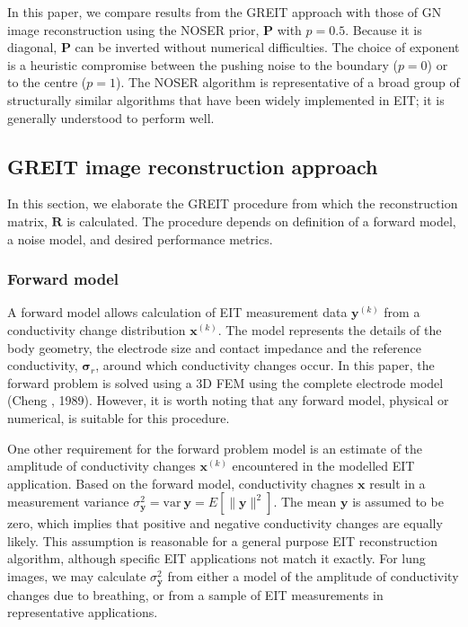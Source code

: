 \documentclass[12pt]{iopart}
\newcommand{\xB}{\mbox{$\mathbf{x}$}}
\newcommand{\yB}{\mbox{$\mathbf{y}$}}
\newcommand{\RB}{\mbox{$\mathbf{R}$}}
\renewcommand{\PB}{\mbox{$\mathbf{P}$}}
\newcommand{\sG}{\mbox{${\boldsymbol \sigma}$}}
\begin{document}
In this paper, we compare results from the GREIT approach
with those of GN image reconstruction using the NOSER prior,
$\PB$ with $p=0.5$.
Because it is diagonal, $\PB$ can be
inverted without numerical difficulties. The choice of exponent is
a heuristic compromise between the pushing noise to the boundary
($p=0$) or to the centre ($p=1$). The NOSER algorithm is 
representative of a broad group of structurally similar 
algorithms that have been widely implemented in EIT;
it is generally understood to perform well.


\subsection{GREIT image reconstruction approach}

In this section, we elaborate the GREIT procedure
from which the reconstruction matrix, $\RB$ is
calculated.  The procedure depends on definition
of a forward model, a noise model, and
desired performance metrics.

\subsubsection{Forward model}

A forward model allows calculation of EIT
 measurement
data $\yB^{(k)}$ from a conductivity change distribution $\xB^{(k)}$.
The model represents the details of the body geometry,
the electrode size and contact impedance and the reference
conductivity, $\sG_r$, around which conductivity changes occur.
In this paper, the forward problem is solved using a
3D FEM using the complete electrode model
(Cheng \etal, 1989). However, it is worth noting that 
any forward model, physical or numerical, is suitable
for this procedure.

One other requirement for the forward problem model is
an estimate of the amplitude of conductivity changes $\xB^{(k)}$
encountered in the modelled EIT application. Based on the
forward model, conductivity chagnes $\xB$ result in
a measurement variance
$\sigma_{\yB}^2 = \mathrm{var}~\yB = E[ \| \yB \|^2 ]$. 
The mean $\yB$ is assumed to be zero, which implies
that positive and negative conductivity changes are
equally likely. This assumption is reasonable for a 
general purpose EIT reconstruction algorithm, although
specific EIT applications not match it exactly.
For lung images, we may calculate $\sigma_{\yB}^2$ from either
a model of the amplitude of conductivity changes due
to breathing, or from a sample of EIT measurements 
in representative applications.
\end{document}
